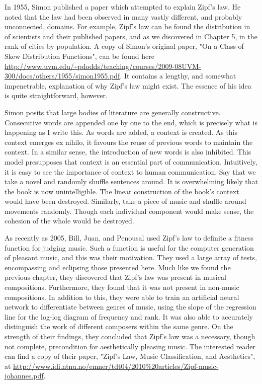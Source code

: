 \documentclass[10pt]{book}
\begin{document}
In 1955, Simon published a paper which attempted to explain Zipf's law. He noted that the law had been observed in many vastly different, and probably unconnected, domains. For example, Zipf's law can be found the distribution in of scientists and their published papers, and as we discovered in Chapter 5, in the rank of cities by population. A copy of Simon's original paper, "On a Class of Skew Distribution Functions", can be found here \url{http://www.uvm.edu/~pdodds/teaching/courses/2009-08UVM-300/docs/others/1955/simon1955.pdf}. It contains a lengthy, and somewhat impenetrable, explanation of why Zipf's law might exist. The essence of his idea is quite straightforward, however.

Simon posits that large bodies of literature are generally constructive. Consecutive words are appended one by one to the end, which is precisely what is happening as I write this. As words are added, a context is created. As this context emerges ex nihilo, it favours the reuse of previous words to maintain the context. In a similar sense, the introduction of new words is also inhibited. This model presupposes that context is an essential part of communication. Intuitively, it is easy to see the importance of context to human communication. Say that we take a novel and randomly shuffle sentences around. It is overwhelming likely that the book is now unintelligible. The linear construction of the book's context would have been destroyed. Similarly, take a piece of music and shuffle around movements randomly. Though each individual component would make sense, the cohesion of the whole would be destroyed.

As recently as 2005, Bill, Juan, and Penousal used Zipf's law to definite a fitness function for judging music. Such a function is useful for the computer generation of pleasant music, and this was their motivation. They used a large array of tests, encompassing and eclipsing those presented here. Much like we found the previous chapter, they discovered that Zipf's law was present in musical compositions. Furthermore, they found that it was not present in non-music compositions. In addition to this, they were able to train an artificial neural network to differentiate between genres of music, using the slope of the regression line for the log-log diagram of frequency and rank. It was also able to accurately distinguish the work of different composers within the same genre. On the strength of their findings, they concluded that Zipf's law was a necessary, though not complete, precondition for aesthetically pleasing music. The interested reader can find a copy of their paper, "Zipf's Law, Music Classification, and Aesthetics", at \url{http://www.idi.ntnu.no/emner/tdt04/2010\%20articles/Zipf-music-johannes.pdf}.
\end{document}
